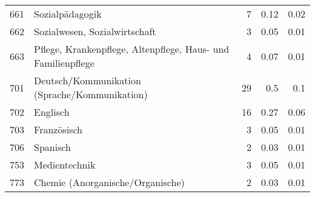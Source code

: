 \begin{longtable}{lXrrr}
        661 & \multicolumn{1}{X}{Sozialpädagogik} & %
          \num{7} &
          \num[round-mode=places,round-precision=2]{0.12} &
          \num[round-mode=places,round-precision=2]{0.02} \\

        662 & \multicolumn{1}{X}{Sozialwesen, Sozialwirtschaft} & %
          \num{3} &
          \num[round-mode=places,round-precision=2]{0.05} &
          \num[round-mode=places,round-precision=2]{0.01} \\

        663 & \multicolumn{1}{X}{Pflege, Krankenpflege, Altenpflege, Haus- und Familienpflege} & %
          \num{4} &
          \num[round-mode=places,round-precision=2]{0.07} &
          \num[round-mode=places,round-precision=2]{0.01} \\

        701 & \multicolumn{1}{X}{Deutsch/Kommunikation (Sprache/Kommunikation)} & %
          \num{29} &
          \num[round-mode=places,round-precision=2]{0.5} &
          \num[round-mode=places,round-precision=2]{0.1} \\

        702 & \multicolumn{1}{X}{Englisch} & %
          \num{16} &
          \num[round-mode=places,round-precision=2]{0.27} &
          \num[round-mode=places,round-precision=2]{0.06} \\

        703 & \multicolumn{1}{X}{Französisch} & %
          \num{3} &
          \num[round-mode=places,round-precision=2]{0.05} &
          \num[round-mode=places,round-precision=2]{0.01} \\

        706 & \multicolumn{1}{X}{Spanisch} & %
          \num{2} &
          \num[round-mode=places,round-precision=2]{0.03} &
          \num[round-mode=places,round-precision=2]{0.01} \\

        753 & \multicolumn{1}{X}{Medientechnik} & %
          \num{3} &
          \num[round-mode=places,round-precision=2]{0.05} &
          \num[round-mode=places,round-precision=2]{0.01} \\

        773 & \multicolumn{1}{X}{Chemie (Anorganische/Organische)} & %
          \num{2} &
          \num[round-mode=places,round-precision=2]{0.03} &
          \num[round-mode=places,round-precision=2]{0.01} \\


\end{longtable}
